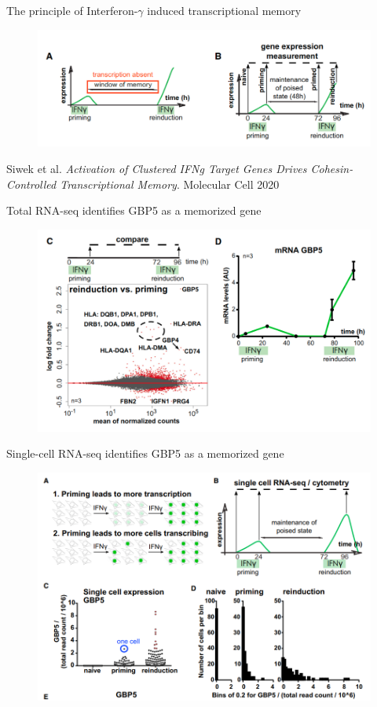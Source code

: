 \documentclass[aspectratio=1610]{beamer}					%
\begin{document}
\begin{frame}{The principle of Interferon-$\gamma$ induced transcriptional memory}
\begin{figure}
\includegraphics[width=14cm]{figure-1.png}
\caption{}
\end{figure}

Siwek et al. \textit{Activation of Clustered IFNg Target Genes Drives Cohesin-Controlled Transcriptional Memory}. Molecular Cell 2020

\end{frame}


\begin{frame}{Total RNA-seq identifies GBP5 as a memorized gene}
\begin{figure}
\includegraphics[width=13cm]{figure-2.png}
\end{figure}

\end{frame}

\begin{frame}{Single-cell RNA-seq identifies GBP5 as a memorized gene}
\begin{figure}
\includegraphics[width=12cm]{figure-3.png}
\end{figure}

\end{frame}
\end{document}
